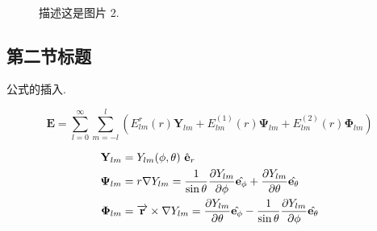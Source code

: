 \documentclass[UTF8, a4paper]{ctexart}
\numberwithin{equation}{section} %
\begin{document}
		\begin{figure}[ht]
			\centering
			\quad
			 \\
			\caption{描述这是图片 2.}
		\end{figure}

	\subsection{第二节标题}

		公式的插入.

		\begin{equation}
			\mathbf{E}=\sum_{l=0}^{\infty} \sum_{m=-l}^{l}\left(E_{l m}^{r}(r) \mathbf{Y}_{l m}+E_{l m}^{(1)}(r) \boldsymbol{\Psi}_{l m}+E_{l m}^{(2)}(r) \boldsymbol{\Phi}_{l m}\right)
		\end{equation}

		\begin{align}
			\mathbf{Y}_{l m}    & =Y_{l m}(\phi,\theta)\  \hat{\mathbf{e}}_r \\
			\notag %
		    \boldsymbol{\Psi}_{l m} & =r \nabla Y_{l m}=\frac{1}{\sin \theta} \frac{\partial Y_{lm}}{\partial \phi}\hat{\mathbf{e}_{\phi}} + \frac{\partial Y_{lm}}{\partial \theta}\hat{\mathbf{e}_{\theta}} \\
		    \boldsymbol{\Phi}_{l m} & =\overrightarrow{\mathbf{r}} \times \nabla Y_{l m}=\frac{\partial Y_{lm}}{\partial \theta}\hat{\mathbf{e}_{\phi}} -\frac{1}{\sin \theta} \frac{\partial Y_{lm}}{\partial \phi}\hat{\mathbf{e}_{\theta}}
		\end{align}
\end{document}
